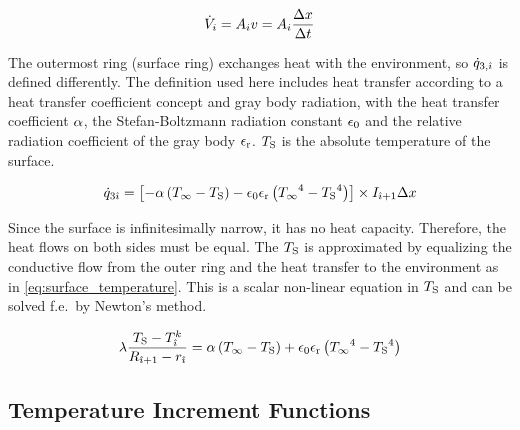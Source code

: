 \documentclass{PyRollDocs}
\begin{document}
    \begin{equation}
        {\dot{V}}_{i} = {A}_{{i}} {v} = {A}_{{i}} \frac{{\Delta x}}{{\Delta t}}
        \label{eq:volume_flow}
    \end{equation}

    The outermost ring (surface ring) exchanges heat with the environment, so ${\dot{q}}_{3,{\hat{\imath}}}$ is defined differently.
    The definition used here includes heat transfer according to a heat transfer coefficient concept and gray body radiation, with the heat transfer coefficient ${\alpha}$, the Stefan-Boltzmann radiation constant ${\epsilon_0}$ and the relative radiation coefficient of the gray body ${\epsilon_\mathrm{r}}$.
    ${T_\mathrm{S}}$ is the absolute temperature of the surface.

    \begin{equation}
        {\dot{q}}_{3{\hat{\imath}}} = \left[ -{\alpha} \left( {T_\infty} - {T_\mathrm{S}} \right) - {\epsilon_0}{\epsilon_\mathrm{r}}\left( {T_\infty}^4 - {T_\mathrm{S}}^4 \right) \right]
        \times {I}_{{\hat{\imath}}+1} {\Delta x}
        \label{eq:heat_flow_3_surface}
    \end{equation}

    Since the surface is infinitesimally narrow, it has no heat capacity.
    Therefore, the heat flows on both sides must be equal.
    The ${T_\mathrm{S}}$ is approximated by equalizing the conductive flow from the outer ring and the heat transfer to the environment as in \autoref{eq:surface_temperature}.
    This is a scalar non-linear equation in ${T_\mathrm{S}}$ and can be solved f.e.\ by Newton's method.

    \begin{equation}
        {\lambda} \frac{{T_\mathrm{S}} - {T}_{\hat{\imath}}^{k}}{{R}_{{\hat{\imath}}+1} - {r}_{{\hat{\imath}}}} = {\alpha} \left( {T_\infty} - {T_\mathrm{S}} \right) + {\epsilon_0}{\epsilon_\mathrm{r}}\left( {T_\infty}^4 - {T_\mathrm{S}}^4 \right)
        \label{eq:surface_temperature}
    \end{equation}

    \subsection{Temperature Increment Functions}\label{subsec:temperature-increment-functions}
\end{document}
